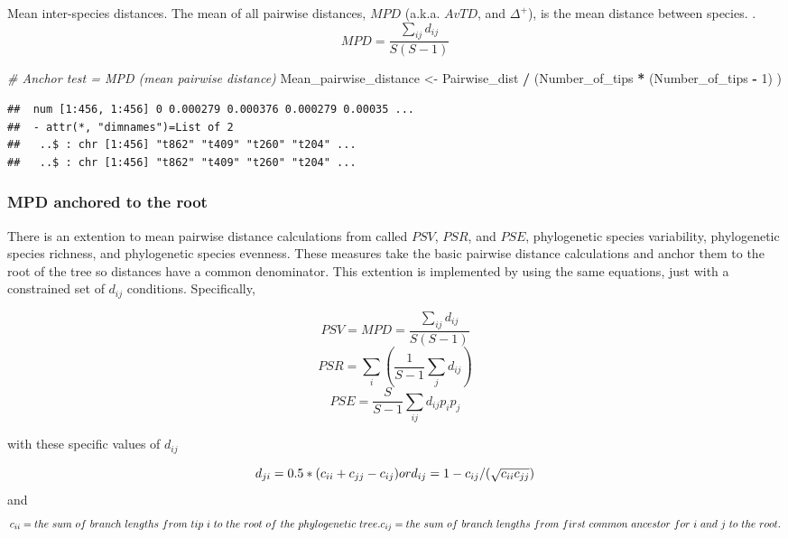 \documentclass[]{book}
\newenvironment{Shaded}{\begin{snugshade}}{\end{snugshade}}
\newcommand{\DecValTok}[1]{\textcolor[rgb]{0.00,0.00,0.81}{{#1}}}
\newcommand{\StringTok}[1]{\textcolor[rgb]{0.31,0.60,0.02}{{#1}}}
\newcommand{\CommentTok}[1]{\textcolor[rgb]{0.56,0.35,0.01}{\textit{{#1}}}}
\newcommand{\OperatorTok}[1]{\textcolor[rgb]{0.81,0.36,0.00}{\textbf{{#1}}}}
\newcommand{\NormalTok}[1]{{#1}}
\theoremstyle{definition}
\theoremstyle{definition}
\theoremstyle{remark}
\begin{document}
Mean inter-species distances. The mean of all pairwise distances,
\(MPD\) (a.k.a. \(AvTD\), and \(\Delta^{+}\)), is the mean distance
between species. \citep{Clarke1998, Webb2002, Webb2008, Kembel2010}.
\[MPD = \dfrac{\sum_{ij} d_{ij}}{S(S-1)}\]

\begin{Shaded}
\begin{Highlighting}[]
\CommentTok{# Anchor test = MPD (mean pairwise distance)}
\NormalTok{Mean_pairwise_distance <-}\StringTok{ }
\StringTok{  }\NormalTok{Pairwise_dist }\OperatorTok{/}\StringTok{ }\NormalTok{(Number_of_tips }\OperatorTok{*}\StringTok{ }\NormalTok{(Number_of_tips }\OperatorTok{-}\StringTok{ }\DecValTok{1}\NormalTok{) ) }
\end{Highlighting}
\end{Shaded}

\begin{verbatim}
##  num [1:456, 1:456] 0 0.000279 0.000376 0.000279 0.00035 ...
##  - attr(*, "dimnames")=List of 2
##   ..$ : chr [1:456] "t862" "t409" "t260" "t204" ...
##   ..$ : chr [1:456] "t862" "t409" "t260" "t204" ...
\end{verbatim}

\subsubsection{MPD anchored to the root}\label{mpd-anchored-to-the-root}

There is an extention to mean pairwise distance calculations from
\citet{Helmus2010} called \(PSV\), \(PSR\), and \(PSE\), phylogenetic
species variability, phylogenetic species richness, and phylogenetic
species evenness. These measures take the basic pairwise distance
calculations and anchor them to the root of the tree so distances have a
common denominator. This extention is implemented by using the same
equations, just with a constrained set of \(d_{ij}\) conditions.
Specifically,

\[PSV = MPD = \dfrac{\sum_{ij} d_{ij}}{S(S-1)}\]
\[PSR = \sum_{i} {(\dfrac{1}{S-1} \sum_{j} {d_{ij}})}\]
\[PSE = \dfrac{S}{S-1} \sum_{ij} d_{ij}p_{i}p_{j}\]

with these specific values of \(d_{ij}\)

\[
d_{ji}=0.5*(c_{ii} + c_{jj} - c_{ij}) \\ 
\ \\
or \\
\ \\
d_{ij} = 1 - c_{ij} / (\sqrt{c_{ii}c_{jj}}) 
\] and \[
c_{ii} = the \ sum \ of \ branch \ lengths \ from \ tip \ i  \ to \ the \ root \ of \ the \ phylogenetic \ tree. \\
\ \\
c_{ij} = the \ sum \  of \ branch \ lengths \ from \ first \ common \ ancestor \ for \ i \ and \ j \ to \ the \ root.
\]
\end{document}

